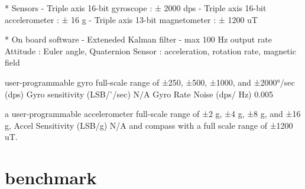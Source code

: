  * Sensors
    - Triple axis 16-bit gyroscope : ± 2000 dps
    - Triple axis 16-bit accelerometer : ± 16 g
    - Triple axis 13-bit magnetometer : ± 1200 uT

 * On board software
    - Exteneded Kalman filter
    - max 100 Hz output rate
           Attitude : Euler angle, Quaternion
           Sensor : acceleration, rotation rate, magnetic field


  user-programmable gyro full-scale range of ±250, ±500, ±1000, and ±2000°/sec (dps)
   Gyro sensitivity (LSB/$^{\circ}$/sec) N/A
 Gyro Rate Noise (dps/ Hz) 0.005

 a user-programmable accelerometer full-scale range of ±2 g, ±4 g, ±8 g, and ±16 g,
 Accel Sensitivity  (LSB/g) N/A
 and compass with a full scale range of ±1200 uT.






 \section{benchmark}

